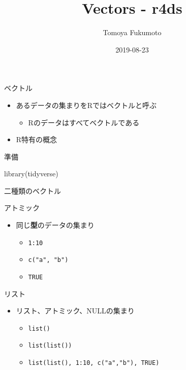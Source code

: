 \documentclass[
  ignorenonframetext,
]{beamer}
\title{Vectors - r4ds}
\author{Tomoya Fukumoto}
\date{2019-08-23}
\newenvironment{Shaded}{\begin{snugshade}}{\end{snugshade}}
\newcommand{\FunctionTok}[1]{\textcolor[rgb]{0.00,0.00,0.00}{#1}}
\newcommand{\NormalTok}[1]{#1}
\providecommand{\tightlist}{%
  \setlength{\itemsep}{0pt}\setlength{\parskip}{0pt}}
\begin{document}
\frame{\titlepage}

\begin{frame}[fragile]{ベクトル}
\protect\hypertarget{ux30d9ux30afux30c8ux30eb}{}
\begin{itemize}
\tightlist
\item
  あるデータの集まりをRではベクトルと呼ぶ

  \begin{itemize}
  \tightlist
  \item
    Rのデータはすべてベクトルである
  \end{itemize}
\item
  R特有の概念
\end{itemize}

\begin{block}{準備}
\protect\hypertarget{ux6e96ux5099}{}
\begin{Shaded}
\begin{Highlighting}[]
\FunctionTok{library}\NormalTok{(tidyverse)}
\end{Highlighting}
\end{Shaded}
\end{block}
\end{frame}

\begin{frame}[fragile]{二種類のベクトル}
\protect\hypertarget{ux4e8cux7a2eux985eux306eux30d9ux30afux30c8ux30eb}{}
\begin{block}{アトミック}
\protect\hypertarget{ux30a2ux30c8ux30dfux30c3ux30af}{}
\begin{itemize}
\tightlist
\item
  同じ\textbf{型}のデータの集まり

  \begin{itemize}
  \tightlist
  \item
    \texttt{1:10}
  \item
    \texttt{c("a",\ "b")}
  \item
    \texttt{TRUE}
  \end{itemize}
\end{itemize}
\end{block}

\begin{block}{リスト}
\protect\hypertarget{ux30eaux30b9ux30c8}{}
\begin{itemize}
\tightlist
\item
  リスト、アトミック、NULLの集まり

  \begin{itemize}
  \tightlist
  \item
    \texttt{list()}
  \item
    \texttt{list(list())}
  \item
    \texttt{list(list(),\ 1:10,\ c("a","b"),\ TRUE)}
  \end{itemize}
\end{itemize}
\end{block}
\end{frame}
\end{document}
